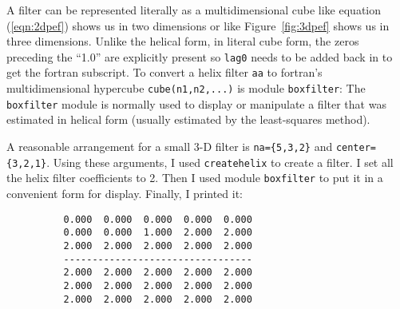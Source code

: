 \par
A filter can be represented literally as a multidimensional cube
like equation (\ref{eqn:2dpef}) shows us in two dimensions
or like Figure~\ref{fig:3dpef} shows us in three dimensions.
Unlike the helical form, in literal cube form,
the zeros preceding the ``1.0'' are explicitly present
so \texttt{lag0} needs to be added back in to get the fortran subscript.
To convert a helix filter \texttt{aa} to fortran's multidimensional hypercube
\texttt{cube(n1,n2,...)} is
module \texttt{boxfilter}: %
The \texttt{boxfilter} module is normally used
to display or manipulate a filter
that was estimated in helical form
(usually estimated by the least-squares method).

\begin{comment}
\par
The inverse process to \texttt{boxfilter} is to
convert a fortran hypercube to a helix filter.
For this we have module \texttt{unbox}. %
It abandons all zero-valued coefficients
such as those that should be zero before the box's 1.0.
It abandons the ``1.0'' as well, because it is implicitly present
in the helix convolution module \texttt{helicon} \vpageref{lst:helicon}.
\moddex{unbox}{Convert hypercube filter to helix}
An example of using \texttt{unbox} would be copying some numbers
such as the factored laplacian in equation (\ref{eqn:lapfac})
into a cube and then converting it to a helix.
\end{comment}

\par
A reasonable arrangement for a small 3-D filter is 
\texttt{na=\{5,3,2\}}
and
\texttt{center=\{3,2,1\}}.
Using these arguments, I used 
\texttt{createhelix}  to create a filter.
I set all the helix filter coefficients to 2.
Then I used module \texttt{boxfilter} 
to put it in a convenient form for display.
Finally, I printed it:
\par\noindent
\footnotesize
\begin{verbatim}
          0.000  0.000  0.000  0.000  0.000
          0.000  0.000  1.000  2.000  2.000
          2.000  2.000  2.000  2.000  2.000
          ---------------------------------
          2.000  2.000  2.000  2.000  2.000
          2.000  2.000  2.000  2.000  2.000
          2.000  2.000  2.000  2.000  2.000
\end{verbatim}
\normalsize
\par\noindent

